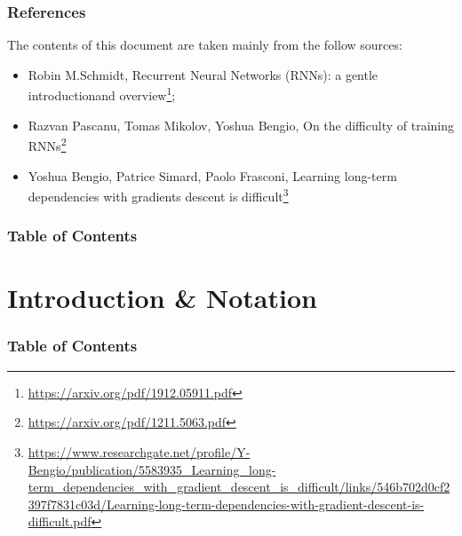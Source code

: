 \documentclass[11pt,]{beamer}
\begin{document}
\begin{frame}
	\frametitle{References}
	The contents of this document are taken mainly from the follow sources:
	\begin{itemize}
		\item Robin M.Schmidt, Recurrent Neural Networks (RNNs): a gentle introductionand overview\footnote[1]{\url{https://arxiv.org/pdf/1912.05911.pdf}};
		\item Razvan Pascanu, Tomas Mikolov, Yoshua Bengio, On the difficulty of training RNNs\footnote[2]{\url{https://arxiv.org/pdf/1211.5063.pdf}}
		\item Yoshua Bengio, Patrice Simard, Paolo Frasconi, Learning long-term dependencies with gradients descent is difficult\footnote[3]{\url{https://www.researchgate.net/profile/Y-Bengio/publication/5583935_Learning_long-term_dependencies_with_gradient_descent_is_difficult/links/546b702d0cf2397f7831c03d/Learning-long-term-dependencies-with-gradient-descent-is-difficult.pdf}}
	\end{itemize}

\end{frame}
\begin{frame}
	\frametitle{Table of Contents} %
	
	\tableofcontents %
\end{frame}


\section{Introduction \& Notation} %
\begin{frame}
	\frametitle{Table of Contents}

	\tableofcontents[currentsection]
\end{frame}
\end{document}
